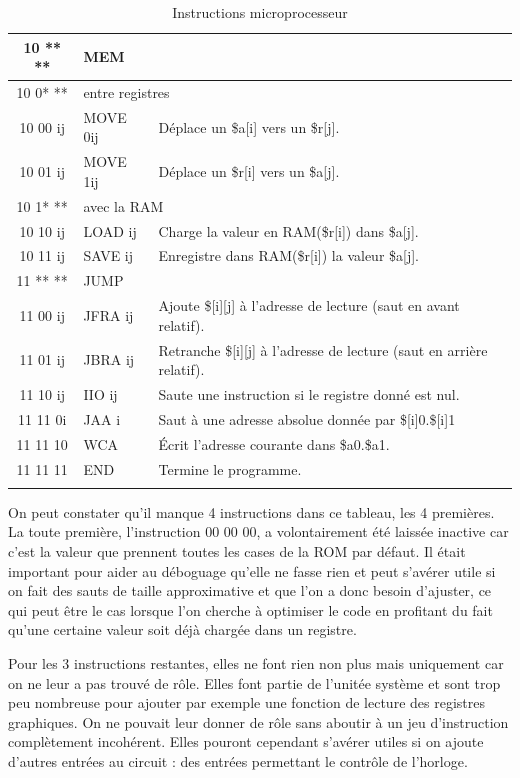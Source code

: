 \documentclass{article}
\begin{document}
\begin{savenotes}
\begin{longtable}{|c|l|l|}
  \hline\hline
  10 ** ** & \multicolumn{2}{|l|}{MEM} \\
  \hline
  10 0* ** & \multicolumn{2}{|l|}{entre registres} \\
  \hline
  10 00 ij & MOVE 0ij & Déplace un \$a[i] vers un \$r[j]. \\
  10 01 ij & MOVE 1ij & Déplace un \$r[i] vers un \$a[j]. \\
  \hline
  10 1* ** & \multicolumn{2}{|l|}{avec la RAM} \\
  \hline
  10 10 ij & LOAD ij  & Charge la valeur en RAM(\$r[i]) dans \$a[j]. \\
  10 11 ij & SAVE ij  & Enregistre dans RAM(\$r[i]) la valeur \$a[j]. \\

  \hline\hline
  11 ** ** & \multicolumn{2}{|l|}{JUMP} \\
  \hline
  11 00 ij & JFRA ij & Ajoute \$[i][j] à l'adresse de lecture (saut en avant relatif). \\
  11 01 ij & JBRA ij & Retranche \$[i][j] à l'adresse de lecture (saut en arrière relatif). \\
  11 10 ij & IIO  ij & Saute une instruction si le registre donné est nul. \\
  11 11 0i & JAA  i  & Saut à une adresse absolue donnée par \$[i]0.\$[i]1\\
  11 11 10 & WCA     & \'Ecrit l'adresse courante dans \$a0.\$a1. \\
  11 11 11 & END      & Termine le programme. \\
  \hline

\caption{Instructions microprocesseur}
\end{longtable}
\end{savenotes}

On peut constater qu'il manque 4 instructions dans ce tableau, les 4 premières.
La toute première, l'instruction 00 00 00, a volontairement été laissée inactive
car c'est la valeur que prennent toutes les cases de la ROM par défaut. Il était
important pour aider au déboguage qu'elle ne fasse rien et peut s'avérer utile
si on fait des sauts de taille approximative et que l'on a donc besoin d'ajuster,
ce qui peut être le cas lorsque l'on cherche à optimiser le code en profitant du
fait qu'une certaine valeur soit déjà chargée dans un registre.

Pour les 3 instructions restantes, elles ne font rien non plus mais uniquement car
on ne leur a pas trouvé de rôle. Elles font partie de l'unitée système et sont trop
peu nombreuse pour ajouter par exemple une fonction de lecture des registres graphiques.
On ne pouvait leur donner de rôle sans aboutir à un jeu d'instruction complètement
incohérent. Elles pouront cependant s'avérer utiles si on ajoute d'autres entrées
au circuit : des entrées permettant le contrôle de l'horloge.
\end{document}
